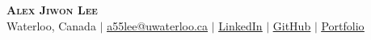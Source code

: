\begin{center}
    \textbf{\Huge \scshape Alex Jiwon Lee} \\ \vspace{1pt}
    {Waterloo, Canada} $|$ 
    \href{mailto:a55lee@uwaterloo.ca}{\underline{a55lee@uwaterloo.ca}} $|$ 
    \href{https://www.linkedin.com/in/alex-jiwon-lee/}{\underline{LinkedIn}} $|$
    \href{https://github.com/1128alex}{\underline{GitHub}} $|$ 
    \href{https://1128alex.github.io/alex-lee/}{\underline{Portfolio}}
\end{center}
